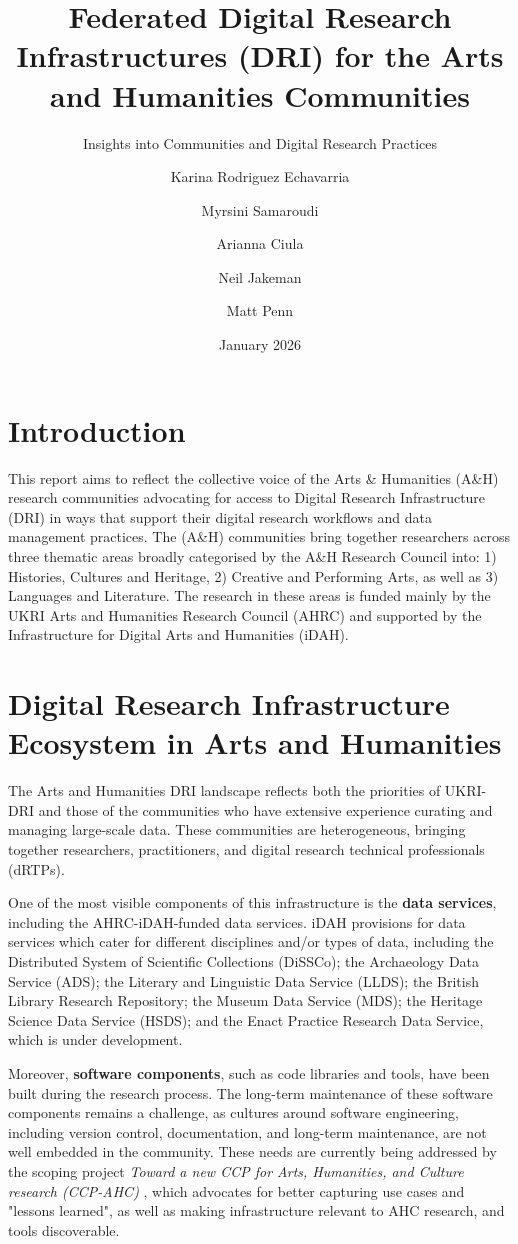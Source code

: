 \documentclass[11pt]{scrartcl}
\title{Federated Digital Research Infrastructures (DRI) for the Arts and Humanities Communities}
\subtitle{\LARGE{Insights into Communities and Digital Research Practices}}
\date{\normalsize{January 2026}}
\author[1]{Karina Rodriguez Echavarria}
\author[1]{Myrsini Samaroudi}
\author[2]{Arianna Ciula}
\author[2]{Neil Jakeman}
\author[2]{Matt Penn}
\affil[1]{University of Brighton}
\affil[2]{King's Digital Lab, King's College London}
\begin{document}
\sffamily
\maketitle
\section{Introduction} 
This report aims to reflect the collective voice of the Arts \& Humanities (A\&H) research communities advocating for access to Digital Research
 Infrastructure (DRI) in ways that support their digital research workflows and data management practices. 
 The (A\&H) communities bring together researchers across three
 thematic areas broadly categorised by the A\&H Research Council into: 1)
 Histories, Cultures and Heritage, 2) Creative and Performing Arts, as well as
 3) Languages and Literature. The research in these areas is
 funded mainly by the UKRI Arts and Humanities Research Council (AHRC) and
 supported by the Infrastructure for Digital Arts and Humanities (iDAH).   

\section{Digital Research Infrastructure Ecosystem in Arts and Humanities}
The Arts and Humanities DRI landscape reflects both the priorities of UKRI-DRI and those of the communities who have extensive experience curating and managing large-scale data. These communities are heterogeneous, bringing together researchers, practitioners, and digital research technical professionals (dRTPs).

One of the most visible components of this infrastructure is the \textbf{data services}, including the AHRC-iDAH-funded data services. iDAH provisions for data services which cater for different disciplines
and/or types of data, including the Distributed System of Scientific
Collections (DiSSCo); the Archaeology Data Service (ADS); the Literary and Linguistic Data Service (LLDS); the British Library Research Repository; the Museum Data Service (MDS); the Heritage Science Data Service (HSDS); and the Enact Practice Research Data Service, which is under development.

Moreover, \textbf{software components}, such as code libraries and tools, have been built during the research process.
The long-term maintenance of these software components remains a challenge, as cultures around software engineering, including version control, documentation, and long-term maintenance, are not well embedded in the community. These needs are   
currently being addressed by the scoping project \emph{Toward a new CCP for Arts, Humanities, and Culture research (CCP-AHC)} \cite{bell_2025_17099176}, which advocates for better capturing use cases and "lessons learned", as well as making infrastructure relevant to AHC research, and tools discoverable. 
\end{document}
